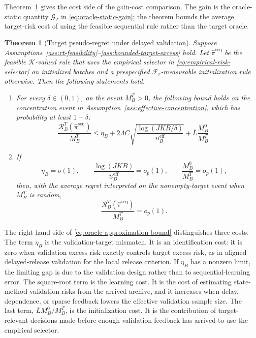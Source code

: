 \documentclass[a4paper, 12pt]{article}
\theoremstyle{plain}
\newtheorem{theorem}{Theorem}
\theoremstyle{remark}
\newcommand{\Kcal}{\mathcal{K}}
\newcommand{\Fcal}{\mathcal{F}}
\newcommand{\1}{\mathbf{1}}
\begin{document}
Theorem~\ref{thm:oracle-approximation} gives the cost side of the gain-cost comparison. The gain is the oracle-static quantity \(\mathcal G_T\) in \eqref{eq:oracle-static-gain}; the theorem bounds the average target-risk cost of using the feasible sequential rule rather than the target oracle.

\begin{theorem}[Target pseudo-regret under delayed validation]
\label{thm:oracle-approximation}
Suppose Assumptions~\ref{ass:rt-feasibility}--\ref{ass:bounded-target-excess} hold. Let \(\widehat\pi^{\mathrm{seq}}\) be the feasible \(\Kcal\)-valued rule that uses the empirical selector in \eqref{eq:empirical-risk-selector} on initialized batches and a prespecified \(\Fcal_r\)-measurable initialization rule otherwise. Then the following statements hold.
\begin{enumerate}[label=(\alph*), leftmargin=*]
    \item For every \(\delta\in(0,1)\), on the event \(M^T_B>0\), the following bound holds on the concentration event in Assumption~\ref{ass:effective-concentration}, which has probability at least \(1-\delta\):
    \begin{equation}
    \label{eq:oracle-approximation-bound}
        \frac{\mathcal R^T_B(\widehat\pi^{\mathrm{seq}})}{M^T_B}
        \leq
        \eta_B
        +
        2\Lambda C
        \sqrt{
            \frac{\log(JKB/\delta)}{\underline n^{\mathrm{eff}}_B}
        }
        +
        \bar L\frac{M^0_B}{M^T_B} .
    \end{equation}
    \item If
    \begin{equation}
    \label{eq:oracle-approximation-rates}
        \eta_B=o(1),
        \qquad
        \frac{\log(JKB)}{\underline n^{\mathrm{eff}}_B}=o_p(1),
        \qquad
        \frac{M^0_B}{M^T_B}=o_p(1),
    \end{equation}
    then, with the average regret interpreted on the nonempty-target event when \(M^T_B\) is random,
    \begin{equation}
    \label{eq:oracle-approximation-convergence}
        \frac{\mathcal R^T_B(\widehat\pi^{\mathrm{seq}})}{M^T_B}=o_p(1) .
    \end{equation}
\end{enumerate}
\end{theorem}

The right-hand side of \eqref{eq:oracle-approximation-bound} distinguishes three costs. The term \(\eta_B\) is the validation-target mismatch. It is an identification cost: it is zero when validation excess risk exactly controls target excess risk, as in aligned delayed-release validation for the local release criterion. If \(\eta_B\) has a nonzero limit, the limiting gap is due to the validation design rather than to sequential-learning error. The square-root term is the learning cost. It is the cost of estimating state-method validation risks from the arrived archive, and it increases when delay, dependence, or sparse feedback lowers the effective validation sample size. The last term, \(\bar L M^0_B/M^T_B\), is the initialization cost. It is the contribution of target-relevant decisions made before enough validation feedback has arrived to use the empirical selector.
\end{document}
